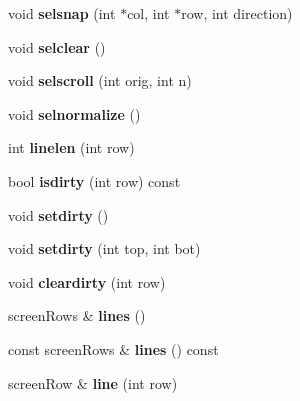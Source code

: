\begin{DoxyCompactItemize}
\mbox{\label{classScreen_aeb938be8e4a6678deb194d0efaf68c25}} 
void {\bfseries selsnap} (int $\ast$col, int $\ast$row, int direction)
\item 
\mbox{\label{classScreen_a8339c139dc53961b7757fcdc769273f0}} 
void {\bfseries selclear} ()
\item 
\mbox{\label{classScreen_a45586a86465c585d31a626b5ddadc6d6}} 
void {\bfseries selscroll} (int orig, int n)
\item 
\mbox{\label{classScreen_ab0db0b33330308f87898a289531f9195}} 
void {\bfseries selnormalize} ()
\item 
\mbox{\label{classScreen_a9d618f57e2f36ab54796930eafa936e3}} 
int {\bfseries linelen} (int row)
\item 
\mbox{\label{classScreen_a4a73c8d3d6e9004e8ae1a433dc9276a3}} 
bool {\bfseries isdirty} (int row) const
\item 
\mbox{\label{classScreen_a89e5efa7bece308ada02b7bea90dfeea}} 
void {\bfseries setdirty} ()
\item 
\mbox{\label{classScreen_a06ea48a519ac1d0fff26f8940efe4402}} 
void {\bfseries setdirty} (int top, int bot)
\item 
\mbox{\label{classScreen_a9a2e979daea517788d5c5efaacd6d06d}} 
void {\bfseries cleardirty} (int row)
\item 
\mbox{\label{classScreen_a3530ffffe8c583c8f2ded6cd607135b4}} 
screen\+Rows \& {\bfseries lines} ()
\item 
\mbox{\label{classScreen_a3d62596aae93b832c3148329e9a7a9e9}} 
const screen\+Rows \& {\bfseries lines} () const
\item 
\mbox{\label{classScreen_a8a29453ed4b072c4359b46732c5c2f5f}} 
screen\+Row \& {\bfseries line} (int row)
\item 
\mbox{\label{classScreen_aa117db3767143c37ef99e0d2493b0714}} 

\end{DoxyCompactItemize}
